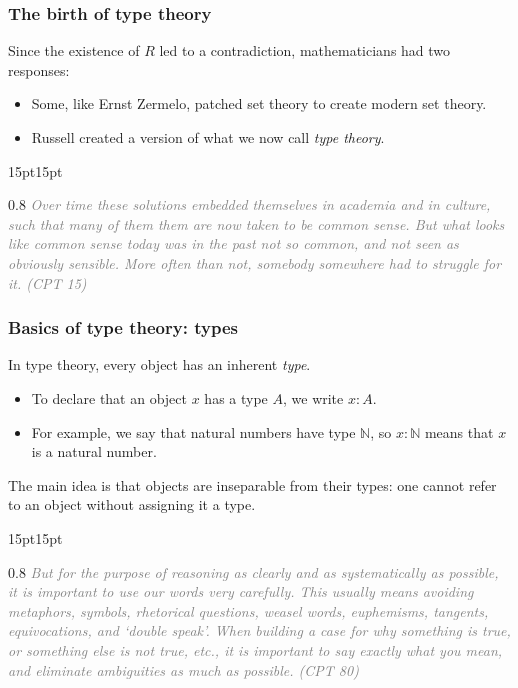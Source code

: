 \documentclass{beamer}
\providecommand{\NN}{\mathbb N}
\providecommand{\ii}{\item}
\begin{document}
\begin{frame}\frametitle{The birth of type theory}
	Since the existence of $R$ led to a contradiction,
	mathematicians had two responses:
	\begin{itemize}
		\ii Some, like Ernst Zermelo, patched set theory
		to create modern set theory.
		\ii Russell created a version of what we now call \emph{type theory}.
	\end{itemize}
	
	\begin{adjustwidth}{15pt}{15pt}
		\begin{spacing}{0.8}
			\textit{\textcolor{gray}{\scriptsize
			Over time these solutions embedded themselves in academia and in
			culture, such that many of them them are now taken
			to be common sense. But what looks like common
			sense today was in the past not so common, and not
			seen as obviously sensible. More often than not,
			somebody somewhere had to struggle for it. (CPT 15)
			}}
		\end{spacing}
	\end{adjustwidth}
\end{frame}

\begin{frame}\frametitle{Basics of type theory: types}
	In type theory, every object has an inherent \emph{type}.
	\begin{itemize}
		\ii To declare that an object $x$ has a type $A$,
		we write $x : A$.
		\ii For example, we say that natural numbers
		have type $\NN$, so $x : \NN$ means that $x$ is a natural number.
	\end{itemize}
	The main idea is that objects are inseparable from their types:
	one cannot refer to an object without assigning it a type.
	
	\begin{adjustwidth}{15pt}{15pt}
		\begin{spacing}{0.8}
			\textit{\textcolor{gray}{\scriptsize
			But for the purpose of reasoning as clearly and as systematically as possible, it is important to use our words very carefully. This usually means avoiding metaphors, symbols, rhetorical questions, weasel words, euphemisms, tangents, equivocations, and
			`double speak'. When building a case for why something is true, or something else is not true, etc., it is important to say exactly what you mean, and eliminate ambiguities as much as possible. (CPT 80)
			}}
		\end{spacing}
	\end{adjustwidth}
	
\end{frame}
\end{document}
